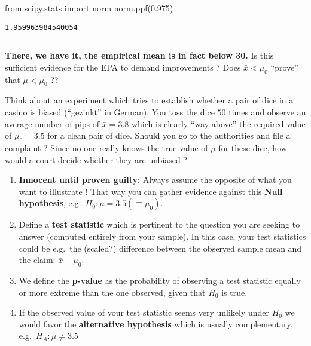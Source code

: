 \documentclass[
  letterpaper,
  DIV=11,
  numbers=noendperiod]{scrreprt}
\newenvironment{Shaded}{\begin{snugshade}}{\end{snugshade}}
\newcommand{\FloatTok}[1]{\textcolor[rgb]{0.68,0.00,0.00}{#1}}
\newcommand{\ImportTok}[1]{\textcolor[rgb]{0.00,0.46,0.62}{#1}}
\newcommand{\NormalTok}[1]{\textcolor[rgb]{0.00,0.23,0.31}{#1}}
\providecommand{\tightlist}{%
  \setlength{\itemsep}{0pt}\setlength{\parskip}{0pt}}\usepackage{longtable,booktabs,array}
\begin{document}
\begin{Shaded}
\begin{Highlighting}[]
\ImportTok{from}\NormalTok{ scipy.stats }\ImportTok{import}\NormalTok{ norm}
\NormalTok{norm.ppf(}\FloatTok{0.975}\NormalTok{)}
\end{Highlighting}
\end{Shaded}

\begin{verbatim}
1.959963984540054
\end{verbatim}

\begin{center}\rule{0.5\linewidth}{0.5pt}\end{center}

\textbf{There, we have it, the empirical mean is in fact below 30.} Is
this sufficient evidence for the EPA to demand improvements ? Does
\(\bar{x} < \mu_0\) ``prove'' that \(\mu < \mu_0\) ??

Think about an experiment which tries to establish whether a pair of
dice in a casino is biased (``gezinkt'' in German). You toss the dice
\(50\) times and observe an average number of pips of \(\bar{x} = 3.8\)
which is clearly ``way above'' the required value of \(\mu_0 = 3.5\) for
a clean pair of dice. Should you go to the authorities and file a
complaint ? Since no one really knows the true value of \(\mu\) for
these dice, how would a court decide whether they are unbiased ?

\begin{enumerate}
\def\labelenumi{\arabic{enumi}.}
\tightlist
\item
  \textbf{Innocent until proven guilty}: Always assume the opposite of
  what you want to illustrate ! That way you can gather evidence against
  this \textbf{Null hypothesis}, e.g.~\(H_0: \mu = 3.5 (\equiv \mu_0)\).
\item
  Define a \textbf{test statistic} which is pertinent to the question
  you are seeking to answer (computed entirely from your sample). In
  this case, your test statistics could be e.g.~the (scaled?) difference
  between the observed sample mean and the claim: \(\bar{x} - \mu_0\).
\item
  We define the \textbf{p-value} as the probability of observing a test
  statistic equally or more extreme than the one observed, given that
  \(H_0\) is true.
\item
  If the observed value of your test statistic seems very unlikely under
  \(H_0\) we would favor the \textbf{alternative hypothesis} which is
  usually complementary, e.g.~\(H_A: \mu \neq 3.5\)
\end{enumerate}
\end{document}
